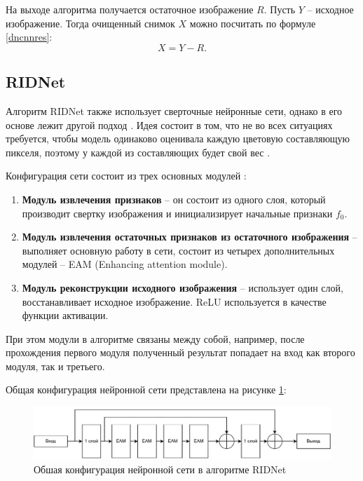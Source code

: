 \newpage
На выходе алгоритма получается остаточное изображение $R$. 
Пусть $Y$ -- исходное изображение.
Тогда очищенный снимок $X$ можно посчитать по формуле \eqref{dncnnres}:
\begin{equation}
 	\label{dncnnres}
 	X = Y - R.
\end{equation}

\subsection{RIDNet}
Алгоритм RIDNet также использует сверточные нейронные сети, однако в его основе лежит другой подход \cite{ridnet2}.
Идея состоит в том, что не во всех ситуациях требуется, чтобы модель одинаково оценивала каждую цветовую составляющую пикселя, поэтому у каждой из составляющих будет свой вес \cite{ridnet}.

Конфигурация сети состоит из трех основных модулей \cite{ridnet}: 
\begin{enumerate}
	\item \textbf{Модуль извлечения признаков} -- он состоит из одного слоя, который производит свертку изображения и инициализирует начальные признаки $f_0$.
	\item \textbf{Модуль извлечения остаточных признаков из остаточного изображения} -- выполняет основную работу в сети, состоит из четырех дополнительных модулей -- EAM (Enhancing attention module).
	\item  \textbf{Модуль реконструкции исходного изображения} -- использует один слой, восстанавливает исходное изображение. ReLU используется в качестве функции активации.
\end{enumerate}

При этом модули в алгоритме связаны между собой, например, после прохождения первого модуля полученный результат попадает на вход как второго модуля, так и третьего.

Общая конфигурация нейронной сети представлена на рисунке \ref{fig::ridnetall}:
\FloatBarrier
\begin{figure}[h]	
	\begin{center}
		\includegraphics[width=\linewidth]{inc/pdf/ridnet.pdf}
	\end{center}
	\captionsetup{justification=centering}
	\caption{Обшая конфигурация нейронной сети в алгоритме RIDNet}
	\label{fig::ridnetall}
\end{figure}
\FloatBarrier

